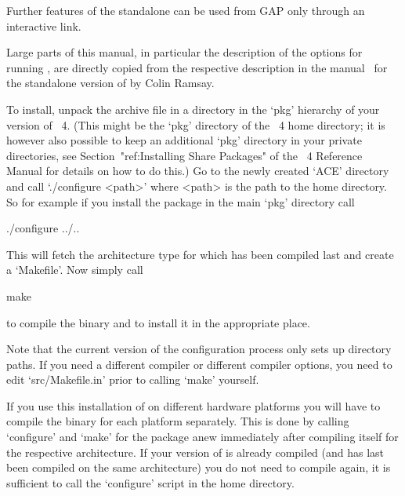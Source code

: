 Further features  of the {\ACE} standalone  can be used  from GAP only
through an interactive link.



Large parts of this manual,  in  particular  the  description  of  the
options for running {\ACE}, are directly copied  from  the  respective
description in the manual~\cite{Ram99} for the standalone  version  of
{\ACE} by Colin Ramsay.



To  install, unpack  the  archive file  in  a directory  in the  `pkg'
hierarchy  of your  version  of  {\GAP}~4. (This  might  be the  `pkg'
directory of the {\GAP}~4 home  directory; it is however also possible
to keep an additional `pkg' directory in your private directories, see
Section~"ref:Installing  Share Packages"  of  the {\GAP}~4   Reference
Manual for details  on how to do this.) Go to  the newly created `ACE'
directory and  call `./configure <path>'  where <path> is the  path to
the {\GAP} home  directory. So for example if  you install the package
in the main `pkg' directory call

\begintt
./configure ../..
\endtt

This  will fetch  the  architecture  type for  which  {\GAP} has  been
compiled last and create a `Makefile'. Now simply call

\begintt
make
\endtt

to compile the binary and to install it in the appropriate place.

Note that the  current version of the configuration  process only sets
up  directory paths.  If you  need a  different compiler  or different
compiler options, you need  to edit `src/Makefile.in' prior to calling
`make' yourself.

If you use this installation of {\GAP} on different hardware platforms
you will have to compile the binary for each platform separately. This
is  done  by calling  `configure'  and  `make'  for the  package  anew
immediately   after  compiling  {\GAP}   itself  for   the  respective
architecture.  If your version of  {\GAP} is already compiled (and has
last  been compiled  on  the same  architecture)  you do  not need  to
compile {\GAP} again, it is  sufficient to call the `configure' script
in the {\GAP} home directory.

